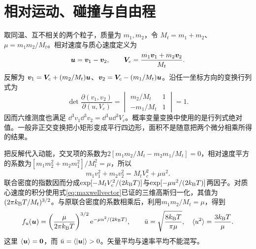 \section{相对运动、碰撞与自由程}
\label{th:relative}
取同温、互不相关的两个粒子，质量为 $m_1,m_2$，令 $M_t=m_1+m_2$、$\mu=m_1m_2/M_t$。相对速度与质心速度定义为
\[
 \bm{u}=\bm{v}_1-\bm{v}_2,\qquad
 \bm{V}_c=\frac{m_1\bm{v}_1+m_2\bm{v}_2}{M_t}.
\]
反解为 $\bm{v}_1=\bm{V}_c+(m_2/M_t)\bm{u}$、$\bm{v}_2=\bm{V}_c-(m_1/M_t)\bm{u}$。沿任一坐标方向的变换行列式为
\[
 \det\frac{\partial(v_1,v_2)}{\partial(u,V_c)}
 =\begin{vmatrix}m_2/M_t&1\\-m_1/M_t&1\end{vmatrix}=1.
\]
因而六维测度也满足 $\dd^3v_1\dd^3v_2=\dd^3u\dd^3V_c$。概率变量变换中使用的是行列式绝对值。一般非正交变换把小矩形变成平行四边形，面积不是随意把两个微分相乘所得的结果。

把反解代入动能，交叉项的系数为$2[m_1m_2/M_t-m_2m_1/M_t]=0$，相对速度平方的系数为$[m_1m_2^2+m_2m_1^2]/M_t^2=\mu$，所以
\[
 m_1v_1^2+m_2v_2^2=M_tV_c^2+\mu u^2.
\]
联合密度的指数因而分成$\exp[-M_tV_c^2/(2k_{\mathrm B} T)]$与$\exp[-\mu u^2/(2k_{\mathrm B} T)]$两因子。对质心速度的积分使用式\eqref{eq:maxwellvector}已证的三维高斯归一化，其值为$(2\pi k_{\mathrm B} T/M_t)^{3/2}$。与原联合密度的系数相乘后，利用$m_1m_2/M_t=\mu$，得到
\begin{equation}\label{eq:relative}
 f_u(\bm{u})=\left(\frac\mu{2\pi k_{\mathrm B} T}\right)^{3/2}
 \mathrm e^{-\mu u^2/(2k_{\mathrm B} T)},\qquad
 \bar u=\sqrt{\frac{8k_{\mathrm B} T}{\pi\mu}},\quad
 \langle u^2\rangle=\frac{3k_{\mathrm B} T}\mu.
\end{equation}
这里 $\langle\bm{u}\rangle=\bm{0}$，而 $\bar u=\langle|\bm{u}|\rangle>0$。矢量平均与速率平均不能混写。

